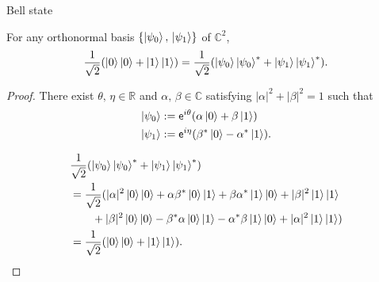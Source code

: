 \documentclass{beamer}
\begin{document}
\begin{frame}{Bell state}
\small
\begin{lemma}
For any orthonormal basis $\{\ket{\psi_0},\,\ket{\psi_1}\}$ of $\mathbb{C}^2$,
\begin{equation*}
\frac1{\sqrt{2}}(\ket{0}\ket{0} + \ket{1}\ket{1})
=
\frac1{\sqrt{2}}(\ket{\psi_0}\ket{\psi_0}^* + \ket{\psi_1}\ket{\psi_1}^*).
\end{equation*}
\end{lemma}

\vspace{-1em}
\begin{proof}
There exist $\theta,\,\eta\in\mathbb{R}$ and $\alpha,\,\beta\in\mathbb{C}$ satisfying $|\alpha|^2+|\beta|^2=1$ such that
\begin{align*}
\ket{\psi_0} &:= \mathsf{e}^{i\theta}(\alpha \ket{0} + \beta \ket{1})\\
\ket{\psi_1} &:= \mathsf{e}^{i\eta}(\beta^* \ket{0} - \alpha^* \ket{1}).
\end{align*}

\vspace{-2.5em}
\begin{align*}
&\frac1{\sqrt{2}}(\ket{\psi_0}\ket{\psi_0}^* + \ket{\psi_1}\ket{\psi_1}^*)\\
&= \frac1{\sqrt{2}}(|\alpha|^2\ket{0}\ket{0} + \alpha\beta^*\ket{0}\ket{1} + \beta\alpha^*\ket{1}\ket{0} + |\beta|^2\ket{1}\ket{1}\\
&\qquad + |\beta|^2\ket{0}\ket{0} - \beta^*\alpha\ket{0}\ket{1} - \alpha^*\beta\ket{1}\ket{0} + |\alpha|^2\ket{1}\ket{1})\\
&= \frac1{\sqrt{2}}(\ket{0}\ket{0} + \ket{1}\ket{1}).
\end{align*}
\end{proof}
\end{frame}
\fi
\end{document}
